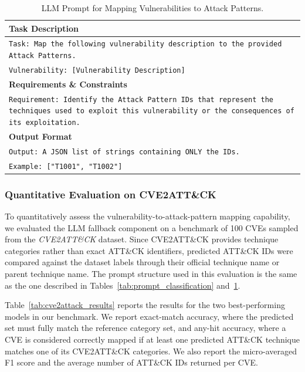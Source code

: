 \documentclass[conference]{IEEEtran}
\begin{document}
\begin{table}[htbp]
\caption{LLM Prompt for Mapping Vulnerabilities to Attack Patterns.}
\label{tab:prompt_mapping}
\centering
\begin{tabular}{|p{}|}
\hline
\rowcolor[HTML]{EFEFEF} 
\textbf{Task Description} \\ \hline
\small \texttt{Task: Map the following vulnerability description to the provided Attack Patterns.} \\
\small \texttt{Vulnerability: [Vulnerability Description]} \\ \hline
\rowcolor[HTML]{EFEFEF} 
\textbf{Requirements \& Constraints} \\ \hline
\small \texttt{Requirement: Identify the Attack Pattern IDs that represent the techniques used to exploit this vulnerability or the consequences of its exploitation.} \\ \hline
\rowcolor[HTML]{EFEFEF} 
\textbf{Output Format} \\ \hline
\small \texttt{Output: A JSON list of strings containing ONLY the IDs.} \\
\small \texttt{Example: ["T1001", "T1002"]} \\ \hline
\end{tabular}
\end{table}

\subsubsection{Quantitative Evaluation on CVE2ATT\&CK}
To quantitatively assess the vulnerability-to-attack-pattern mapping capability, we evaluated the LLM fallback component on a benchmark of 100 CVEs sampled from the \textit{CVE2ATT\&CK} dataset. Since CVE2ATT\&CK provides technique categories rather than exact ATT\&CK identifiers, predicted ATT\&CK IDs were compared against the dataset labels through their official technique name or parent technique name. The prompt structure used in this evaluation is the same as the one described in Tables~\ref{tab:prompt_classification} and~\ref{tab:prompt_mapping}.

Table~\ref{tab:cve2attack_results} reports the results for the two best-performing models in our benchmark. We report exact-match accuracy, where the predicted set must fully match the reference category set, and any-hit accuracy, where a CVE is considered correctly mapped if at least one predicted ATT\&CK technique matches one of its CVE2ATT\&CK categories. We also report the micro-averaged F1 score and the average number of ATT\&CK IDs returned per CVE.
\end{document}
